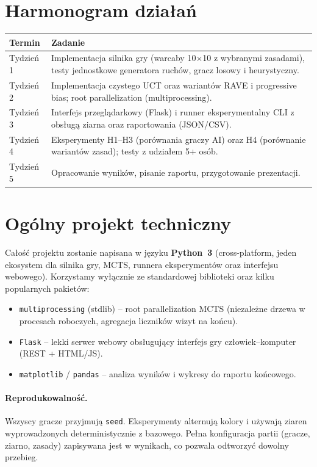 \documentclass[11pt,a4paper]{article}
\begin{document}
\section{Harmonogram działań}

\begin{tabular}{p{3.2cm}p{11cm}}
\toprule
\textbf{Termin} & \textbf{Zadanie} \\
\midrule
Tydzień 1 & Implementacja silnika gry (warcaby 10$\times$10 z
            wybranymi zasadami), testy jednostkowe generatora ruchów,
            gracz losowy i heurystyczny. \\
Tydzień 2 & Implementacja czystego UCT oraz wariantów RAVE i
            progressive bias; root parallelization (multiprocessing). \\
Tydzień 3 & Interfejs przeglądarkowy (Flask) i runner eksperymentalny
            CLI z obsługą ziarna oraz raportowania (JSON/CSV). \\
Tydzień 4 & Eksperymenty H1--H3 (porównania graczy AI) oraz H4
            (porównanie wariantów zasad); testy z udziałem 5+ osób. \\
Tydzień 5 & Opracowanie wyników, pisanie raportu, przygotowanie
            prezentacji. \\
\bottomrule
\end{tabular}

\section{Ogólny projekt techniczny}

Całość projektu zostanie napisana w języku \textbf{Python~3}
(cross-platform, jeden ekosystem dla silnika gry, MCTS, runnera
eksperymentów oraz interfejsu webowego). Korzystamy wyłącznie ze
standardowej biblioteki oraz kilku popularnych pakietów:

\begin{itemize}[noitemsep]
    \item \texttt{multiprocessing} (stdlib) -- root parallelization
        MCTS (niezależne drzewa w procesach roboczych, agregacja
        liczników wizyt na końcu).
    \item \texttt{Flask} -- lekki serwer webowy obsługujący interfejs
        gry człowiek--komputer (REST + HTML/JS).
    \item \texttt{matplotlib} / \texttt{pandas} -- analiza wyników i
        wykresy do raportu końcowego.
\end{itemize}

\paragraph{Reprodukowalność.} Wszyscy gracze przyjmują \texttt{seed}.
Eksperymenty alternują kolory i używają ziaren wyprowadzonych
deterministycznie z bazowego. Pełna konfiguracja partii (gracze, ziarno,
zasady) zapisywana jest w wynikach, co pozwala odtworzyć dowolny
przebieg.
\end{document}
